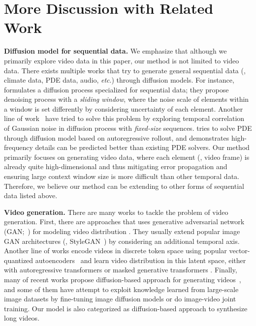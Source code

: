 \section{More Discussion with Related Work}
\label{appen:related}

\textbf{Diffusion model for sequential data.}
We emphasize that although we primarily explore video data in this paper, our method is not limited to video data. There exists multiple works that try to generate general sequential data (\eg, climate data, PDE data, audio, \emph{etc}.) through diffusion models. For instance, \citet{ruhe2024rolling} formulates a diffusion process specialized for sequential data; they propose denoising process with a \emph{sliding window}, where the noise scale of elements within a window is set differently by considering uncertainty of each element. Another line of work~\citep{ge2023preserve,lu2024improve} have tried to solve this problem by exploring temporal correlation of Gaussian noise in diffusion process with \emph{fixed-size} sequences. \citet{lippe2023pderefiner} tries to solve PDE through diffusion model based on autoregressive rollout, and demonstrates high-frequency details can be predicted better than existing PDE solvers. Our method primarily focuses on generating video data, where each element (\ie, video frame) is already quite high-dimensional and thus mitigating error propagation and ensuring large context window size is more difficult than other temporal data. Therefore, we believe our method can be extending to other forms of sequential data listed above. 

\vspace{0.02in}
\noindent\textbf{Video generation.}
There are many works to tackle the problem of video generation. First, there are approaches that uses generative adversarial network (GAN;~\citet{goodfellow2014generative}) for modeling video distribution \citep{tulyakov2018mocogan,yu2022digan,skorokhodov2021stylegan,tian2021good,acharya2018towards,clark2019adversarial,fox2021stylevideogan,gordon2021latent,kahembwe2020lower,munoz2021temporal,saito2017temporal,vondrick2016generating,yushchenko2019markov}. They usually extend popular image GAN architectures (\eg, StyleGAN~\citep{karras2020analyzing}) by considering an additional temporal axis. Another line of works encode videos in discrete token space using popular vector-quantized autoencoders~\citep{yu2024language,van2017neural,yu2022vectorquantized} and learn video distribution in this latent space, either with autoregressive transformers \citep{yu2024language,ge2022long,yan2021videogpt,kalchbrenner2017video,rakhimov2020latent,weissenborn2020scaling} or masked generative transformers \citep{yoo2023towards,yu2023magvit}. Finally, many of recent works propose diffusion-based approach for generating videos~\citep{ho2022video,harvey2022flexible,lu2023vdt,singer2022make,weng2023art,hoppe2022diffusion,yang2022diffusion}, and some of them have attempt to exploit knowledge learned from large-scale image datasets \citep{blattmann2023align,he2022lvdm,ge2023preserve,ho2022imagen,singer2022make,wang2023videofactory,an2023latent} by fine-tuning image diffusion models or do image-video joint training. Our model is also categorized as diffusion-based approach to synthesize long videos.

